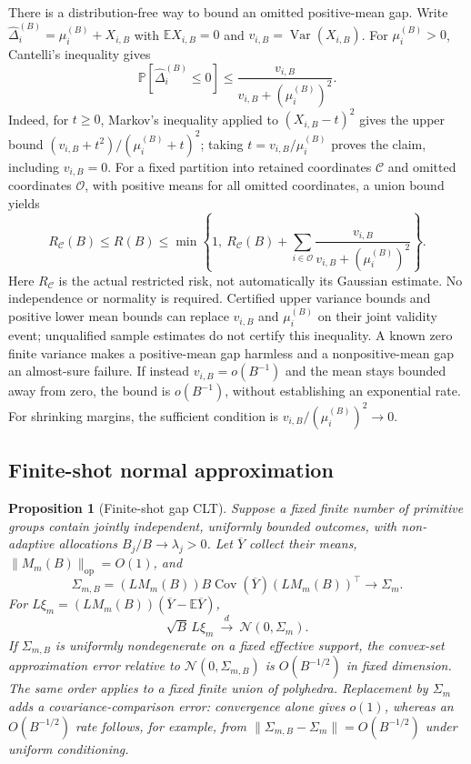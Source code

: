 \documentclass[a4paper,onecolumn,unpublished,nopdfoutputerror]{quantumarticle}
\theoremstyle{plain}
\newtheorem{proposition}[theorem]{Proposition}
\theoremstyle{definition}
\newcommand{\E}{\mathbb{E}}
\newcommand{\Prob}{\mathbb{P}}
\newcommand{\Var}{\operatorname{Var}}
\newcommand{\Cov}{\operatorname{Cov}}
\newcommand{\calC}{\mathcal{C}}
\newcommand{\calN}{\mathcal{N}}
\newcommand{\1}{\mathbf{1}}
\newcommand{\op}{\mathrm{op}}
\begin{document}
There is a distribution-free way to bound an omitted positive-mean gap. Write $\widehat\Delta_i^{(B)}=\mu_i^{(B)}+X_{i,B}$ with $\E X_{i,B}=0$ and $v_{i,B}=\Var(X_{i,B})$. For $\mu_i^{(B)}>0$, Cantelli's inequality gives
\[
\Prob[\widehat\Delta_i^{(B)}\le0]\le
\frac{v_{i,B}}{v_{i,B}+(\mu_i^{(B)})^2}.
\]
Indeed, for $t\ge0$, Markov's inequality applied to $(X_{i,B}-t)^2$ gives the upper bound $(v_{i,B}+t^2)/(\mu_i^{(B)}+t)^2$; taking $t=v_{i,B}/\mu_i^{(B)}$ proves the claim, including $v_{i,B}=0$. For a fixed partition into retained coordinates $\calC$ and omitted coordinates $\mathcal{O}$, with positive means for all omitted coordinates, a union bound yields
\begin{equation}\label{eq:omitted_gap_bound}
R_{\calC}(B)\le R(B)\le
\min\left\{1,\ R_{\calC}(B)+\sum_{i\in\mathcal{O}}
\frac{v_{i,B}}{v_{i,B}+(\mu_i^{(B)})^2}\right\}.
\end{equation}
Here $R_{\calC}$ is the actual restricted risk, not automatically its Gaussian estimate. No independence or normality is required. Certified upper variance bounds and positive lower mean bounds can replace $v_{i,B}$ and $\mu_i^{(B)}$ on their joint validity event; unqualified sample estimates do not certify this inequality. A known zero finite variance makes a positive-mean gap harmless and a nonpositive-mean gap an almost-sure failure. If instead $v_{i,B}=o(B^{-1})$ and the mean stays bounded away from zero, the bound is $o(B^{-1})$, without establishing an exponential rate. For shrinking margins, the sufficient condition is $v_{i,B}/(\mu_i^{(B)})^2\to0$.

\subsection{Finite-shot normal approximation}
\label{app:normal_approximation}

\begin{proposition}[Finite-shot gap CLT]
\label{prop:gap_clt}
Suppose a fixed finite number of primitive groups contain jointly independent, uniformly bounded outcomes, with non-adaptive allocations $B_j/B\to\lambda_j>0$. Let $\overline Y$ collect their means, $\|M_m(B)\|_{\op}=O(1)$, and
\[
\Sigma_{m,B}=(LM_m(B))B\Cov(\overline Y)(LM_m(B))^\top\longrightarrow\Sigma_m.
\]
For $L\xi_m=(LM_m(B))(\overline Y-\E\overline Y)$,
\begin{equation}
\sqrt B\,L\xi_m\ \overset{d}{\longrightarrow}\ \calN(0,\Sigma_m).
\end{equation}
If $\Sigma_{m,B}$ is uniformly nondegenerate on a fixed effective support, the convex-set approximation error relative to $\calN(0,\Sigma_{m,B})$ is $O(B^{-1/2})$ in fixed dimension. The same order applies to a fixed finite union of polyhedra. Replacement by $\Sigma_m$ adds a covariance-comparison error: convergence alone gives $o(1)$, whereas an $O(B^{-1/2})$ rate follows, for example, from $\|\Sigma_{m,B}-\Sigma_m\|=O(B^{-1/2})$ under uniform conditioning.
\end{proposition}
\end{document}
